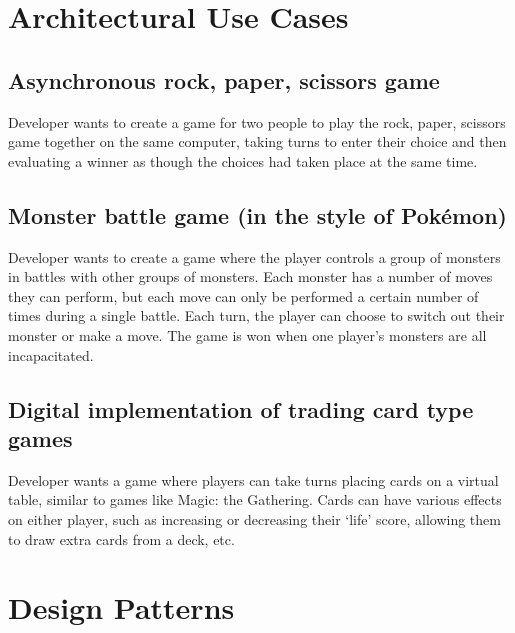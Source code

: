 \documentclass[11pt]{report}
\begin{document}
\section{Architectural Use Cases}
	\subsection{Asynchronous rock, paper, scissors game}
	Developer wants to create a game for two people to play the rock, paper, scissors game together on the same computer, taking turns to enter their choice and then evaluating a winner as though the choices had taken place at the same time. 
	\subsection{Monster battle game (in the style of Pok\'{e}mon\textregistered)}
	Developer wants to create a game where the player controls a group of monsters in battles with other groups of monsters. Each monster has a number of moves they can perform, but each move can only be performed a certain number of times during a single battle. Each turn, the player can choose to switch out their monster or make a move. The game is won when one player’s monsters are all incapacitated.
	\subsection{Digital implementation of trading card type games}
	Developer wants a game where players can take turns placing cards on a virtual table, similar to games like Magic: the Gathering. Cards can have various effects on either player, such as increasing or decreasing their ‘life’ score, allowing them to draw extra cards from a deck, etc.
	
\section{Design Patterns}
\end{document}
